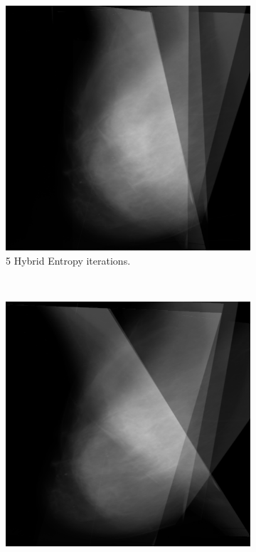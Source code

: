\begin{figure}[H]
    \centering
    \begin{subfigure}[t]{0.3\textwidth}
        \includegraphics[width=\textwidth]{Appendix5/sample2/hybrid/5_hybrid.png}
        \caption{5 Hybrid Entropy iterations.}
        \label{fig:app-5-hybrid-sample2}
    \end{subfigure} \hfill
    ~ %
    \begin{subfigure}[t]{0.3\textwidth}
        \includegraphics[width=\textwidth]{Appendix5/sample2/hybrid/10_hybrid.png}

\end{subfigure}
\end{figure}

